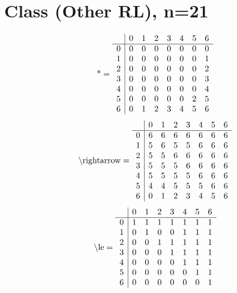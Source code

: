 \documentclass[11pt]{article}
\begin{document}
\section{Class (Other RL), n=21}
\[\text{*} = 
\begin{array}{r | r r r r r r r}
 & 0 & 1 & 2 & 3 & 4 & 5 & 6 \\ \hline
0 & 0 & 0 & 0 & 0 & 0 & 0 & 0 \\
1 & 0 & 0 & 0 & 0 & 0 & 0 & 1 \\
2 & 0 & 0 & 0 & 0 & 0 & 0 & 2 \\
3 & 0 & 0 & 0 & 0 & 0 & 0 & 3 \\
4 & 0 & 0 & 0 & 0 & 0 & 0 & 4 \\
5 & 0 & 0 & 0 & 0 & 0 & 2 & 5 \\
6 & 0 & 1 & 2 & 3 & 4 & 5 & 6 \\
\end{array}
\]
\[\text{\textbackslash rightarrow} = 
\begin{array}{r | r r r r r r r}
 & 0 & 1 & 2 & 3 & 4 & 5 & 6 \\ \hline
0 & 6 & 6 & 6 & 6 & 6 & 6 & 6 \\
1 & 5 & 6 & 5 & 5 & 6 & 6 & 6 \\
2 & 5 & 5 & 6 & 6 & 6 & 6 & 6 \\
3 & 5 & 5 & 5 & 6 & 6 & 6 & 6 \\
4 & 5 & 5 & 5 & 5 & 6 & 6 & 6 \\
5 & 4 & 4 & 5 & 5 & 5 & 6 & 6 \\
6 & 0 & 1 & 2 & 3 & 4 & 5 & 6 \\
\end{array}
\]
\[\text{\textbackslash le} = 
\begin{array}{r | r r r r r r r}
 & 0 & 1 & 2 & 3 & 4 & 5 & 6 \\ \hline
0 & 1 & 1 & 1 & 1 & 1 & 1 & 1 \\
1 & 0 & 1 & 0 & 0 & 1 & 1 & 1 \\
2 & 0 & 0 & 1 & 1 & 1 & 1 & 1 \\
3 & 0 & 0 & 0 & 1 & 1 & 1 & 1 \\
4 & 0 & 0 & 0 & 0 & 1 & 1 & 1 \\
5 & 0 & 0 & 0 & 0 & 0 & 1 & 1 \\
6 & 0 & 0 & 0 & 0 & 0 & 0 & 1 \\
\end{array}
\]
\end{document}
